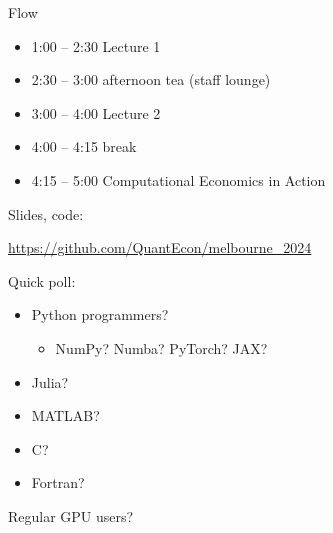 \documentclass[
    xcolor={svgnames,dvipsnames},
    hyperref={colorlinks, citecolor=DeepPink4, linkcolor=DarkRed, urlcolor=DarkBlue}
    ]{beamer}  %
\newcommand{\1}{\mathbbm 1}
\begin{document}
\begin{frame}

    Flow
    \begin{itemize}
        \item 1:00 -- 2:30 Lecture 1
        \item 2:30 -- 3:00 afternoon tea (staff lounge)
        \item 3:00 -- 4:00 Lecture 2
        \item 4:00 -- 4:15 break
        \item 4:15 -- 5:00 Computational Economics in Action
    \end{itemize}
    

    \vspace{0.5em}

    Slides, code:

    \vspace{0.5em}

    \begin{center}
        \url{https://github.com/QuantEcon/melbourne_2024}
    \end{center}


\end{frame}

\begin{frame}
    
    Quick poll:

    \begin{itemize}
        \item Python programmers?
    \vspace{0.5em}
            \begin{itemize}
                \item NumPy?  Numba?  PyTorch? JAX?
            \end{itemize}
    \vspace{0.5em}
        \item Julia?
    \vspace{0.5em}
        \item MATLAB?
    \vspace{0.5em}
        \item C?
    \vspace{0.5em}
        \item Fortran?
    \end{itemize}


    \vspace{0.5em}
    \vspace{0.5em}
    Regular GPU users?
    
\end{frame}
\end{document}
